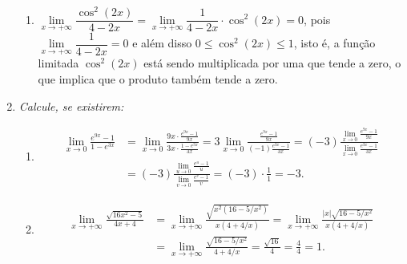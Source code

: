 \documentclass[12pt,a4paper]{article}
\newcommand*\abs[1]{\left|#1\right|}
\begin{document}
\begin{enumerate}
\begin{enumerate}
\item $\lim\limits_{x\to +\infty} \dfrac{\cos^2(2x)}{4-2x} = \lim\limits_{x\to +\infty} \dfrac{1}{4-2x} \cdot \cos^2(2x) = 0$, pois $\lim\limits_{x\to +\infty} \dfrac{1}{4-2x} = 0$ e além disso $0 \leq \cos^2(2x) \leq 1$, isto é, a função limitada $\cos^2(2x)$ está sendo multiplicada por uma que tende a zero, o que implica que o produto também tende a zero.

\end{enumerate}

\item \textit{ Calcule, se existirem: }
\begin{enumerate}
\item
\begin{align*}
\lim\limits_{x\to 0} \frac{e^{9x}-1}{1-e^{3x}}
& = \lim\limits_{x\to 0} \frac{9x \cdot \frac{e^{9x}-1}{9x}}{3x \cdot \frac{1-e^{3x}}{3x}}
  = 3\lim\limits_{x\to 0} \frac{\frac{e^{9x}-1}{9x}}{(-1)\frac{e^{3x}-1}{3x}}
  = (-3)\frac{\lim\limits_{x\to 0} \frac{e^{9x}-1}{9x}}{\lim\limits_{x\to 0} \frac{e^{3x}-1}{3x}} \\
& = (-3)\frac{\lim\limits_{u\to 0} \frac{e^{u}-1}{u}}{\lim\limits_{v\to 0} \frac{e^{v}-1}{v}}
  = (-3) \cdot \frac{1}{1}
  = -3.
\end{align*}

\item
\begin{align*}
\lim\limits_{x\to +\infty} \frac{\sqrt{16x^2-5}}{4x+4}
& = \lim\limits_{x\to +\infty} \frac{\sqrt{x^2(16-5/x^2)}}{x(4+4/x)}
  = \lim\limits_{x\to +\infty} \frac{\abs{x} \sqrt{16-5/x^2}}{x(4+4/x)} \\
& = \lim\limits_{x\to +\infty} \frac{ \sqrt{16-5/x^2}}{4+4/x}
  = \frac{ \sqrt{16} }{4}
  = \frac{ 4 }{4}
  = 1.
\end{align*}
\end{enumerate}
\end{enumerate}
\end{document}
